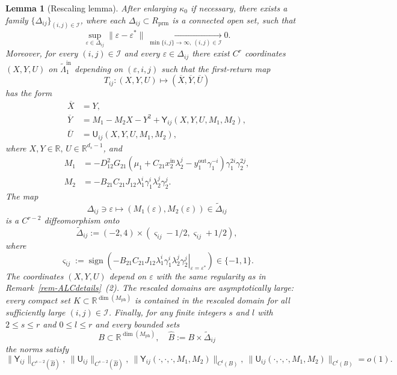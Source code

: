 \documentclass[11pt,a4paper]{article}
\theoremstyle{plain}
\newtheorem{lemma}[theorem]{Lemma}
\theoremstyle{definition}
\theoremstyle{plain}
\numberwithin{equation}{section}
\begin{document}
\begin{lemma}[Rescaling lemma]
\label{lem-rescaling}
After enlarging $\kappa_0$ if necessary, there exists a family $\{\Delta_{ij}\}_{(i,j)\in\mathcal I}$, where each $\Delta_{ij} \subset R_\mathrm{prm}$ is a connected open set, such that
\[
\sup_{\varepsilon \in \Delta_{ij}} \|\varepsilon - \varepsilon^*\|
\xrightarrow[\min\{i,j\}\to\infty,\ (i,j)\in\mathcal I]{} 0.
\]
Moreover, for every $(i,j) \in \mathcal{I}$ and every $\varepsilon \in \Delta_{ij}$ there exist $C^r$ coordinates $(X,Y,U)$ on $\widetilde{\Lambda}_1^\mathrm{in}$ depending on $(\varepsilon,i,j)$ such that the first-return map
\[
T_{ij} : (X,Y,U) \longmapsto (\overline{X},\overline{Y},\overline{U})
\]
has the form
\begin{align*}
\overline{X} &= Y, \\
\overline{Y} &= M_1 - M_2 X - Y^2 + \mathsf{Y}_{ij}(X,Y,U,M_1,M_2), \\
\overline{U} &= \mathsf{U}_{ij}(X,Y,U,M_1,M_2),
\end{align*}
where $X,Y \in \mathbb{R}, \, U \in \mathbb{R}^{d_s-1}$, and
\begin{align*}
M_1 &= -D_{12}^2 G_{21} \left( \mu_1 + C_{21} x_2^\mathrm{in} \lambda_2^j - y_1^\mathrm{out} \gamma_1^{-i} \right) \gamma_1^{2i} \gamma_2^{2j}, \\
M_2 &= -B_{21} C_{21} J_{12} \lambda_1^i \gamma_1^i \lambda_2^j \gamma_2^j.
\end{align*}
The map
\[
\Delta_{ij} \ni \varepsilon \longmapsto (M_1(\varepsilon),M_2(\varepsilon)) \in \widetilde{\Delta}_{ij}
\]
is a $C^{r-2}$ diffeomorphism onto
\[
\widetilde{\Delta}_{ij} := (-2,4) \times (\varsigma_{ij} - 1/2, \varsigma_{ij} + 1/2),
\]
where
\[
\varsigma_{ij}
:=
\operatorname{sign}\left(
\left.
-B_{21}C_{21}J_{12}\lambda_1^i\gamma_1^i\lambda_2^j\gamma_2^j
\right|_{\varepsilon=\varepsilon^*}
\right)
\in \{-1,1\}.
\]
The coordinates $(X, Y, U)$ depend on $\varepsilon$ with the same regularity as in Remark~\ref{rem-ALCdetails}~(2). The rescaled domains are asymptotically large: every compact set $K \subset \mathbb{R}^{\dim(M_\mathrm{ph})}$ is contained in the rescaled domain for all sufficiently large $(i,j) \in \mathcal{I}$. Finally, for any finite integers $s$ and $l$ with $2 \le s \le r$ and $0 \le l \le r$ and every bounded sets
\[
B \subset \mathbb{R}^{\dim(M_\mathrm{ph})}, \quad \widehat{B} := B \times \widetilde{\Delta}_{ij}
\]
the norms satisfy
\[
\|\mathsf{Y}_{ij}\|_{C^{s-2}(\widehat{B})},\ \|\mathsf{U}_{ij}\|_{C^{s-2}(\widehat{B})},\ \|\mathsf{Y}_{ij}(\cdot, \cdot, \cdot, M_1, M_2)\|_{C^{l}(B)},\ \|\mathsf{U}_{ij}(\cdot, \cdot, \cdot, M_1, M_2)\|_{C^{l}(B)} = o(1).
\]
\end{lemma}
\end{document}
